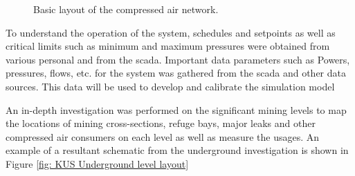 	\begin{figure}[h!]
		\centering
		\caption{Basic layout of the compressed air network.}
		\label{fig: KUS Air layout}
	\end{figure}
 To understand the operation of the system, schedules and setpoints as well as critical limits such as minimum and maximum pressures were obtained from various personal and from the \gls{scada}. Important data parameters such as Powers, pressures, flows, etc. for the system was gathered from the \gls{scada} and other data sources. This data will be used to develop and calibrate the simulation model
\par 
		
	An in-depth investigation was performed on the significant mining levels to map the locations of mining cross-sections, refuge bays, major leaks and other compressed air consumers on each level as well as measure the usages. An example of a resultant schematic from the underground investigation is shown in Figure \ref{fig: KUS Underground level layout}
	
